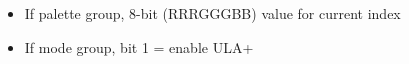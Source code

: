 \begin{itemize}
\item[] If palette group, 8-bit (RRRGGGBB) value for current index
\item[] If mode group, bit 1 = enable ULA+
\end{itemize}

